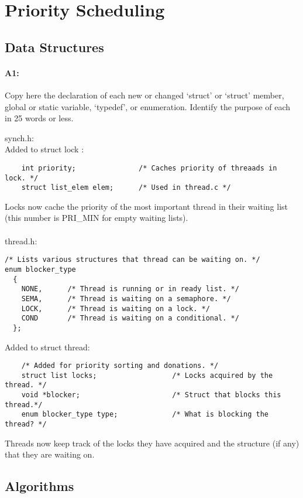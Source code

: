 \section{Priority Scheduling}
\subsection{Data Structures}
\paragraph{A1:} %
Copy here the declaration of each new or changed `struct' or `struct' member, global or static variable, `typedef', or enumeration.  Identify the purpose of each in 25 words or less.

synch.h:\\
Added to struct lock :
\begin{verbatim}
    int priority;               /* Caches priority of threaads in lock. */
    struct list_elem elem;      /* Used in thread.c */
\end{verbatim}
Locks now cache the priority of the most important thread in their waiting list (this number is PRI\_MIN for empty waiting lists).\\ \\

thread.h:
\begin{verbatim}
/* Lists various structures that thread can be waiting on. */
enum blocker_type
  {
    NONE,      /* Thread is running or in ready list. */
    SEMA,      /* Thread is waiting on a semaphore. */
    LOCK,      /* Thread is waiting on a lock. */
    COND       /* Thread is waiting on a conditional. */
  };
\end{verbatim}

Added to struct thread:
\begin{verbatim}
    /* Added for priority sorting and donations. */
    struct list locks;                  /* Locks acquired by the thread. */
    void *blocker;                      /* Struct that blocks this thread.*/
    enum blocker_type type;             /* What is blocking the thread? */
\end{verbatim}
Threads now keep track of the locks they have acquired and the structure (if any) that they are waiting on.


\subsection{Algorithms}
